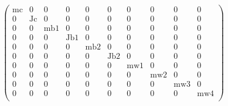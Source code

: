 $$
\left(
\begin{array}{cccccccccc}
 \text{mc} & 0 & 0 & 0 & 0 & 0 & 0 & 0 & 0 & 0 \\
 0 & \text{Jc} & 0 & 0 & 0 & 0 & 0 & 0 & 0 & 0 \\
 0 & 0 & \text{mb1} & 0 & 0 & 0 & 0 & 0 & 0 & 0 \\
 0 & 0 & 0 & \text{Jb1} & 0 & 0 & 0 & 0 & 0 & 0 \\
 0 & 0 & 0 & 0 & \text{mb2} & 0 & 0 & 0 & 0 & 0 \\
 0 & 0 & 0 & 0 & 0 & \text{Jb2} & 0 & 0 & 0 & 0 \\
 0 & 0 & 0 & 0 & 0 & 0 & \text{mw1} & 0 & 0 & 0 \\
 0 & 0 & 0 & 0 & 0 & 0 & 0 & \text{mw2} & 0 & 0 \\
 0 & 0 & 0 & 0 & 0 & 0 & 0 & 0 & \text{mw3} & 0 \\
 0 & 0 & 0 & 0 & 0 & 0 & 0 & 0 & 0 & \text{mw4} \\
\end{array}
\right)
$$